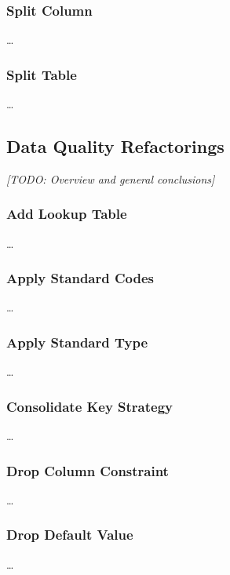 \documentclass{acm_proc_article-sp}
\begin{document}
\subsubsection{Split Column}

\ldots

\subsubsection{Split Table}

\ldots

\subsection{Data Quality Refactorings}

\textit{[TODO: Overview and general conclusions]}

\subsubsection{Add Lookup Table}

\ldots

\subsubsection{Apply Standard Codes}

\ldots

\subsubsection{Apply Standard Type}

\ldots

\subsubsection{Consolidate Key Strategy}

\ldots

\subsubsection{Drop Column Constraint}

\ldots

\subsubsection{Drop Default Value}

\ldots
\end{document}
